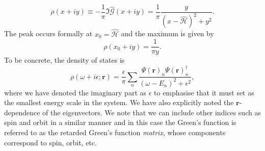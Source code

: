 \begin{equation}
\rho(x+iy)\equiv-\frac{1}{\pi}\Im\hat{\mathcal{G}}(x+iy)=\frac{1}{\pi}\frac{y}{(x-\hat{\mathcal{H}})^2+y^2}.
\end{equation}
The peak occurs formally at $x_0=\hat{\mathcal{H}}$ and the maximum is given by
\begin{equation}
\rho(x_0+iy)=\frac{1}{\pi y}.
\end{equation}
To be concrete, the density of states is
\begin{equation}
\rho(\omega+i\epsilon; \mathbf{r})=\frac{\epsilon}{\pi}\sum_n\frac{\Psi(\mathbf{r})_n\Psi(\mathbf{r})_n^\dagger}{(\omega-E_n)^2+\epsilon^2},
\end{equation}
where we have denoted the imaginary part as $\epsilon$ to emphasise that it must set as the smallest energy scale in the system. We have also explicitly noted the $\mathbf{r}$-dependence of the eigenvectors. We note that we can include other indices such as spin and orbit in a similar manner and in this case the Green's function is referred to as the retarded Green's function \textit{matrix}, whose components correspond to spin, orbit, etc.

